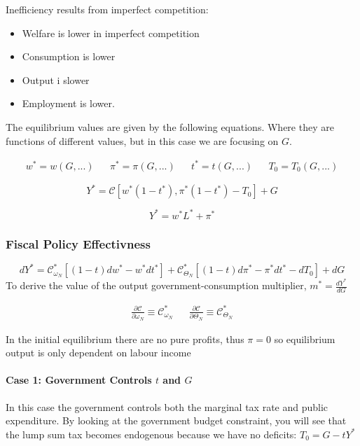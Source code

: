 Inefficiency results from imperfect competition:
\begin{itemize}
    \item Welfare is lower in imperfect competition
    \item Consumption is lower
    \item Output i slower
    \item Employment is lower. 
\end{itemize}


The equilibrium values are given by the following equations. Where they are functions of different values, but in this case we are focusing on $G$. 

\begin{align*}
    w^* = w(G,...) && \pi^* = \pi(G,...) && t^* = t(G,...) && T_0 = T_0(G,...)
\end{align*}

$$
Y^* = \mathcal{C} \left[w^*(1-t^*), \pi^*(1-t^*) - T_0 \right] + G
$$


$$
Y^* = w^*L^* + \pi^* 
$$


\begin{tcolorbox}[fontupper=\large, fontlower=\normalsize]
\subsubsection{Fiscal Policy Effectivness}
\begin{equation}\label{fiscal_policy_effectivness}
dY^* = \mathcal{C}^*_{\omega_N} \left[(1-t)dw^* - w^* dt^* \right] + \mathcal{C}^*_{\Theta_N}\left[(1-t)d\pi^* - \pi^* dt^* - dT_0 \right] +dG
\end{equation}
\tcblower
To derive the value of the output government-consumption multiplier, $m^* = \frac{dY^*}{dG}$
\end{tcolorbox}


\begin{align*}
    \frac{\partial \mathcal{C}}{\partial \omega_N} \equiv \mathcal{C}^*_{\omega_N}
&& \frac{\partial \mathcal{C}}{\partial \Theta_N} \equiv \mathcal{C}^*_{\Theta_N}
\end{align*}

In the initial equilibrium there are no pure profits, thus $\pi = 0$ so equilibrium output is only dependent on labour income


\paragraph{Case 1: Government Controls $t$ and $G$}
In this case the government controls both the marginal tax rate and public expenditure. By looking at the government budget constraint, you will see that the lump sum tax becomes endogenous because we have no deficits: $T_0 = G - tY^*$


